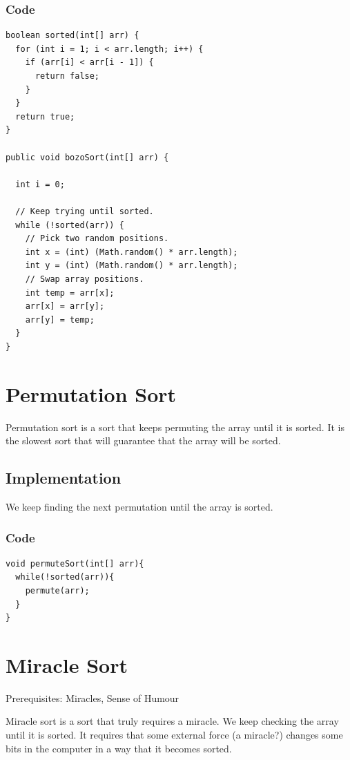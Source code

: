 \documentclass[11pt,oneside]{book}
\begin{document}
\subsubsection{Code}

\begin{lstlisting}
boolean sorted(int[] arr) {
  for (int i = 1; i < arr.length; i++) {
    if (arr[i] < arr[i - 1]) {
      return false;
    }
  }
  return true;
}

public void bozoSort(int[] arr) {

  int i = 0;

  // Keep trying until sorted.
  while (!sorted(arr)) {
    // Pick two random positions.
    int x = (int) (Math.random() * arr.length);
    int y = (int) (Math.random() * arr.length);
    // Swap array positions.
    int temp = arr[x];
    arr[x] = arr[y];
    arr[y] = temp;
  }
}
\end{lstlisting}

        \section{ Permutation Sort }
        

Permutation sort is a sort that keeps permuting the array until it is sorted. It is the slowest sort that will guarantee that the array will be sorted.

\subsection{Implementation}

We keep finding the next permutation until the array is sorted.

\subsubsection{Code}

\begin{lstlisting}
void permuteSort(int[] arr){
  while(!sorted(arr)){
    permute(arr);
  }
}
\end{lstlisting}

        \section{ Miracle Sort }
        

Prerequisites: Miracles, Sense of Humour

Miracle sort is a sort that truly requires a miracle. We keep checking the array until it is sorted. It requires that some external force (a miracle?) changes some bits in the computer in a way that it becomes sorted.
\end{document}
